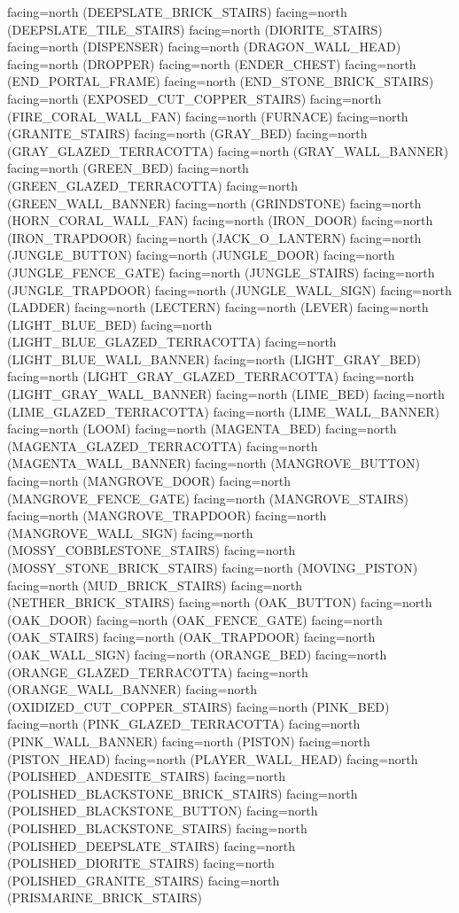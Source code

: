 \documentclass[11pt]{article}
\begin{document}
facing=north (DEEPSLATE_BRICK_STAIRS)
facing=north (DEEPSLATE_TILE_STAIRS)
facing=north (DIORITE_STAIRS)
facing=north (DISPENSER)
facing=north (DRAGON_WALL_HEAD)
facing=north (DROPPER)
facing=north (ENDER_CHEST)
facing=north (END_PORTAL_FRAME)
facing=north (END_STONE_BRICK_STAIRS)
facing=north (EXPOSED_CUT_COPPER_STAIRS)
facing=north (FIRE_CORAL_WALL_FAN)
facing=north (FURNACE)
facing=north (GRANITE_STAIRS)
facing=north (GRAY_BED)
facing=north (GRAY_GLAZED_TERRACOTTA)
facing=north (GRAY_WALL_BANNER)
facing=north (GREEN_BED)
facing=north (GREEN_GLAZED_TERRACOTTA)
facing=north (GREEN_WALL_BANNER)
facing=north (GRINDSTONE)
facing=north (HORN_CORAL_WALL_FAN)
facing=north (IRON_DOOR)
facing=north (IRON_TRAPDOOR)
facing=north (JACK_O_LANTERN)
facing=north (JUNGLE_BUTTON)
facing=north (JUNGLE_DOOR)
facing=north (JUNGLE_FENCE_GATE)
facing=north (JUNGLE_STAIRS)
facing=north (JUNGLE_TRAPDOOR)
facing=north (JUNGLE_WALL_SIGN)
facing=north (LADDER)
facing=north (LECTERN)
facing=north (LEVER)
facing=north (LIGHT_BLUE_BED)
facing=north (LIGHT_BLUE_GLAZED_TERRACOTTA)
facing=north (LIGHT_BLUE_WALL_BANNER)
facing=north (LIGHT_GRAY_BED)
facing=north (LIGHT_GRAY_GLAZED_TERRACOTTA)
facing=north (LIGHT_GRAY_WALL_BANNER)
facing=north (LIME_BED)
facing=north (LIME_GLAZED_TERRACOTTA)
facing=north (LIME_WALL_BANNER)
facing=north (LOOM)
facing=north (MAGENTA_BED)
facing=north (MAGENTA_GLAZED_TERRACOTTA)
facing=north (MAGENTA_WALL_BANNER)
facing=north (MANGROVE_BUTTON)
facing=north (MANGROVE_DOOR)
facing=north (MANGROVE_FENCE_GATE)
facing=north (MANGROVE_STAIRS)
facing=north (MANGROVE_TRAPDOOR)
facing=north (MANGROVE_WALL_SIGN)
facing=north (MOSSY_COBBLESTONE_STAIRS)
facing=north (MOSSY_STONE_BRICK_STAIRS)
facing=north (MOVING_PISTON)
facing=north (MUD_BRICK_STAIRS)
facing=north (NETHER_BRICK_STAIRS)
facing=north (OAK_BUTTON)
facing=north (OAK_DOOR)
facing=north (OAK_FENCE_GATE)
facing=north (OAK_STAIRS)
facing=north (OAK_TRAPDOOR)
facing=north (OAK_WALL_SIGN)
facing=north (ORANGE_BED)
facing=north (ORANGE_GLAZED_TERRACOTTA)
facing=north (ORANGE_WALL_BANNER)
facing=north (OXIDIZED_CUT_COPPER_STAIRS)
facing=north (PINK_BED)
facing=north (PINK_GLAZED_TERRACOTTA)
facing=north (PINK_WALL_BANNER)
facing=north (PISTON)
facing=north (PISTON_HEAD)
facing=north (PLAYER_WALL_HEAD)
facing=north (POLISHED_ANDESITE_STAIRS)
facing=north (POLISHED_BLACKSTONE_BRICK_STAIRS)
facing=north (POLISHED_BLACKSTONE_BUTTON)
facing=north (POLISHED_BLACKSTONE_STAIRS)
facing=north (POLISHED_DEEPSLATE_STAIRS)
facing=north (POLISHED_DIORITE_STAIRS)
facing=north (POLISHED_GRANITE_STAIRS)
facing=north (PRISMARINE_BRICK_STAIRS)
\end{document}

